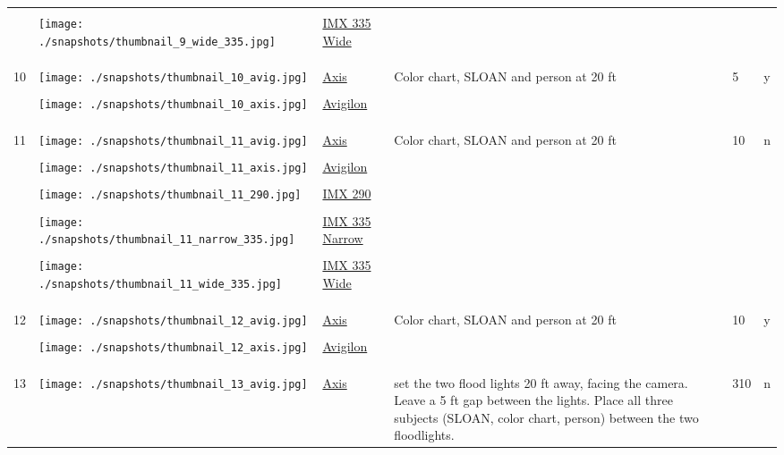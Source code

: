 \documentclass{article}%
\begin{document}
\begin{longtabu}{m{2.5cm} m{4cm} m{2cm} m{4cm} m{2cm} m{2cm}}
&&&&&\\%
&\texttt{[image: ./snapshots/thumbnail\_9\_wide\_335.jpg]}&\href{https://google.com}{IMX 335 Wide}&&&\\%
&&&&&\\%
&&&&&\\%
\hline%
&&&&&\\%
10&\texttt{[image: ./snapshots/thumbnail\_10\_avig.jpg]}&\href{https://google.com}{Axis}&Color chart, SLOAN and person at 20 ft&5&y\\%
&&&&&\\%
&\texttt{[image: ./snapshots/thumbnail\_10\_axis.jpg]}&\href{https://google.com}{Avigilon}&&&\\%
&&&&&\\%
&&&&&\\%
\hline%
&&&&&\\%
11&\texttt{[image: ./snapshots/thumbnail\_11\_avig.jpg]}&\href{https://google.com}{Axis}&Color chart, SLOAN and person at 20 ft&10&n\\%
&&&&&\\%
&\texttt{[image: ./snapshots/thumbnail\_11\_axis.jpg]}&\href{https://google.com}{Avigilon}&&&\\%
&&&&&\\%
&\texttt{[image: ./snapshots/thumbnail\_11\_290.jpg]}&\href{https://google.com}{IMX 290}&&&\\%
&&&&&\\%
&\texttt{[image: ./snapshots/thumbnail\_11\_narrow\_335.jpg]}&\href{https://google.com}{IMX 335 Narrow}&&&\\%
&&&&&\\%
&\texttt{[image: ./snapshots/thumbnail\_11\_wide\_335.jpg]}&\href{https://google.com}{IMX 335 Wide}&&&\\%
&&&&&\\%
&&&&&\\%
\hline%
&&&&&\\%
12&\texttt{[image: ./snapshots/thumbnail\_12\_avig.jpg]}&\href{https://google.com}{Axis}&Color chart, SLOAN and person at 20 ft&10&y\\%
&&&&&\\%
&\texttt{[image: ./snapshots/thumbnail\_12\_axis.jpg]}&\href{https://google.com}{Avigilon}&&&\\%
&&&&&\\%
&&&&&\\%
\hline%
&&&&&\\%
13&\texttt{[image: ./snapshots/thumbnail\_13\_avig.jpg]}&\href{https://google.com}{Axis}&set the two flood lights 20 ft away, facing the camera. Leave a 5 ft gap between the lights. Place all three subjects (SLOAN, color chart, person) between the two floodlights.&310&n\\%

\end{longtabu}
\end{document}
